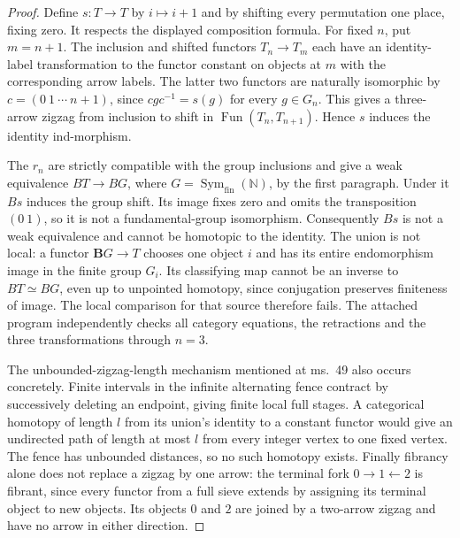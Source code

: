 \begin{proof}
Define $s:T\to T$ by $i\mapsto i+1$ and by shifting every
permutation one place, fixing zero. It respects the displayed
composition formula. For fixed $n$, put $m=n+1$. The inclusion
and shifted functors $T_n\to T_m$ each have an identity-label
transformation to the functor constant on objects at $m$ with
the corresponding arrow labels. The latter two functors are
naturally isomorphic by $c=(0\ 1\ \cdots\ n+1)$, since
$cgc^{-1}=s(g)$ for every $g\in G_n$. This gives a three-arrow
zigzag from inclusion to shift in
$\operatorname{Fun}(T_n,T_{n+1})$. Hence $s$ induces the
identity ind-morphism.

The $r_n$ are strictly compatible with the group inclusions and
give a weak equivalence $BT\to B G$, where
$G=\operatorname{Sym}_{\mathrm{fin}}(\mathbb N)$, by the first
paragraph. Under it $Bs$ induces the group shift. Its image fixes
zero and omits the transposition $(0\ 1)$, so it is not a
fundamental-group isomorphism. Consequently $Bs$ is not a weak
equivalence and cannot be homotopic to the identity. The union is
not local: a functor $\mathbf B G\to T$ chooses one object $i$
and has its entire endomorphism image in the finite group $G_i$.
Its classifying map cannot be an inverse to $BT\simeq BG$,
even up to unpointed homotopy, since conjugation preserves finiteness
of image. The local comparison for that source therefore fails.
The attached program independently checks all category equations,
the retractions and the three transformations through $n=3$.

The unbounded-zigzag-length mechanism mentioned at ms.~49 also
occurs concretely. Finite intervals in the infinite alternating
fence contract by successively deleting an endpoint, giving finite
local full stages. A categorical homotopy of length $l$ from its
union's identity to a constant functor would give an undirected
path of length at most $l$ from every integer vertex to one fixed
vertex. The fence has unbounded distances, so no such homotopy
exists. Finally fibrancy alone does not replace a zigzag by one
arrow: the terminal fork $0\to1\leftarrow2$ is fibrant, since
every functor from a full sieve extends by assigning its terminal
object to new objects. Its objects $0$ and $2$ are joined by a
two-arrow zigzag and have no arrow in either direction.
\end{proof}

